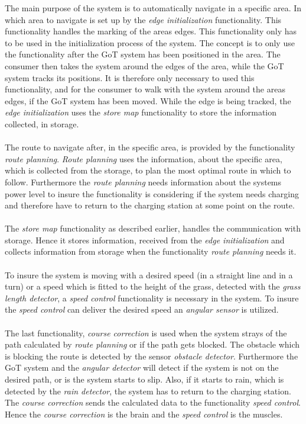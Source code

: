 \noindent
The main purpose of the system is to automatically navigate in a specific area. In which area to navigate is set up by the \textit{edge initialization} functionality. This functionality handles the marking of the areas edges. This functionality only has to be used in the initialization process of the system. The concept is to only use the functionality after the GoT system has been positioned in the area. The consumer then takes the system around the edges of the area, while the GoT system tracks its positions. It is therefore only necessary to used this functionality, and for the consumer to walk with the system around the areas edges, if the GoT system has been moved. While the edge is being tracked, the \textit{edge initialization} uses the \textit{store map} functionality to store the information collected, in storage. \\\\ 
\noindent
The route to navigate after, in the specific area, is provided by the functionality \textit{route planning}. \textit{Route planning} uses the information, about the specific area, which is collected from the storage, to plan the most optimal route in which to follow. Furthermore the \textit{route planning} needs information about the systems power level to insure the functionality is considering if the system needs charging and therefore have to return to the charging station at some point on the route.\\\\
\noindent
The \textit{store map} functionality as described earlier, handles the communication with storage. Hence it stores information, received from the \textit{edge initialization} and collects information from storage when the functionality \textit{route planning} needs it. \\\\
\noindent
To insure the system is moving with a desired speed (in a straight line and in a turn) or a speed which is fitted to the height of the grass, detected with the \textit{grass length detector}, a \textit{speed control} functionality is necessary in the system. To insure the \textit{speed control} can deliver the desired speed an \textit{angular sensor} is utilized. \\\\
\noindent
The last functionality, \textit{course correction} is used when the system strays of the path calculated by \textit{route planning} or if the path gets blocked.
The obstacle which is blocking the route is detected by the sensor \textit{obstacle detector}. Furthermore the GoT system and the \textit{angular detector} will detect if the system is not on the desired path, or is the system starts to slip. Also, if it starts to rain, which is detected by the \textit{rain detector}, the system has to return to the charging station.
The \textit{course correction} sends the calculated data to the functionality \textit{speed control}. Hence the \textit{course correction} is the brain and the \textit{speed control} is the muscles.\\\\






 
 